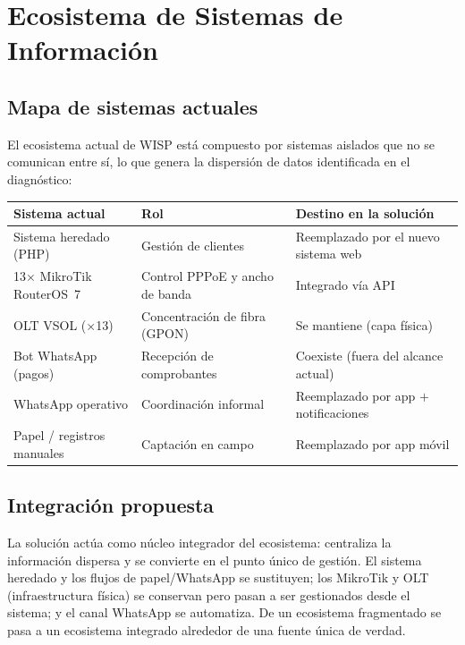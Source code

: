 \section{Ecosistema de Sistemas de Información}
\label{sec:ecosistema}

\subsection{Mapa de sistemas actuales}

El ecosistema actual de WISP está compuesto por sistemas aislados que no se comunican
entre sí, lo que genera la dispersión de datos identificada en el diagnóstico:

\begin{center}
\label{tab:mapa-sistemas}
\begin{tabularx}{\textwidth}{L{3.6cm} X X}
\toprule
\textbf{Sistema actual} & \textbf{Rol} & \textbf{Destino en la solución} \\
\midrule
Sistema heredado (PHP) & Gestión de clientes & Reemplazado por el nuevo sistema web \\
13$\times$ MikroTik RouterOS~7 & Control PPPoE y ancho de banda & Integrado vía API \\
OLT VSOL ($\times$13) & Concentración de fibra (GPON) & Se mantiene (capa física) \\
Bot WhatsApp (pagos) & Recepción de comprobantes & Coexiste (fuera del alcance actual) \\
WhatsApp operativo & Coordinación informal & Reemplazado por app $+$ notificaciones \\
Papel / registros manuales & Captación en campo & Reemplazado por app móvil \\
\bottomrule
\end{tabularx}
\end{center}

\subsection{Integración propuesta}

La solución actúa como núcleo integrador del ecosistema: centraliza la información
dispersa y se convierte en el punto único de gestión. El sistema heredado y los flujos
de papel/WhatsApp se sustituyen; los MikroTik y OLT (infraestructura física) se
conservan pero pasan a ser gestionados desde el sistema; y el canal WhatsApp se
automatiza. De un ecosistema fragmentado se pasa a un ecosistema integrado alrededor de
una fuente única de verdad.


